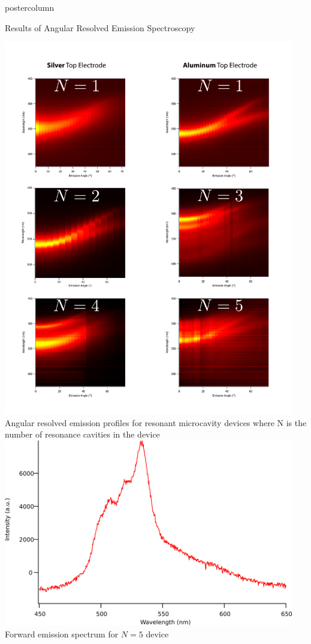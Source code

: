 \documentclass[10pt,papersize={24in,36in}]{beamer}
\begin{document}
\begin{frame}
\begin{columns}
\begin{column}{.49\textwidth}
\begin{beamercolorbox}[center,wd=\textwidth]{postercolumn}
\begin{minipage}[T]{.95\textwidth}
{\begin{block}{Results of Angular Resolved Emission Spectroscopy}
\begin{minipage}{0.55\textwidth}
                    \includegraphics[width=0.95\textwidth]{images/DFDG_Summary.pdf}\\
                    \small Angular resolved emission profiles for resonant microcavity devices where N is the number of resonance cavities in the device
                    \vspace{2cm}\\
                    \includegraphics[width=0.95\textwidth]{images/n5_fe.png}
                    \small Forward emission spectrum for $N=5$ device
                \end{minipage}


\end{block}}
\end{minipage}
\end{beamercolorbox}
\end{column}
\end{columns}
\end{frame}
\end{document}
